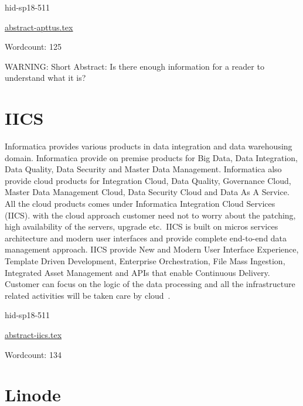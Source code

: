 \begin{IU}

hid-sp18-511

\href{https://github.com/cloudmesh-community/hid-sp18-511/blob/master//technology/abstract-apttus.tex}{abstract-apttus.tex}

 

Wordcount: 125

WARNING: Short Abstract: Is there enough information for a reader to understand what it is?

\end{IU}

\section{IICS}

Informatica provides various products in data integration and data
warehousing domain. Informatica provide on premise products for Big
Data, Data Integration, Data Quality, Data Security and Master Data
Management. Informatica also provide cloud products for Integration
Cloud, Data Quality, Governance Cloud, Master Data Management Cloud,
Data Security Cloud and Data As A Service. All the cloud products
comes under Informatica Integration Cloud Services (IICS).
with the cloud approach customer need not to worry about the patching,
high availability of the servers, upgrade etc.\ IICS is
built on micros services architecture and modern user interfaces and
provide complete end-to-end data management approach. IICS
provide New and Modern User Interface Experience, Template Driven
Development, Enterprise Orchestration, File Mass Ingestion, Integrated
Asset Management and APIs that enable Continuous Delivery. Customer
can focus on the logic of the data processing and all the
infrastructure related activities will be taken care by
cloud~\cite{hid-sp18-511-iics}.
 
 


\begin{IU}

hid-sp18-511

\href{https://github.com/cloudmesh-community/hid-sp18-511/blob/master//technology/abstract-iics.tex}{abstract-iics.tex}

 

Wordcount: 134

\end{IU}

\section{Linode}

